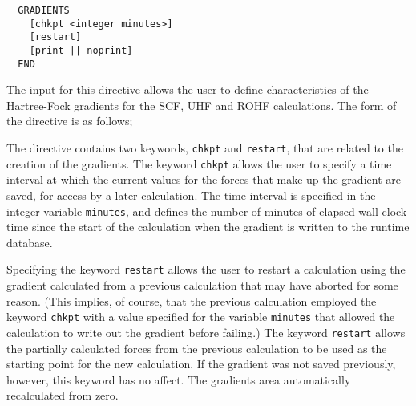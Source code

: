 \label{sec:scfgrad}

\begin{verbatim}
  GRADIENTS 
    [chkpt <integer minutes>]
    [restart]
    [print || noprint]
  END
\end{verbatim}


The input for this directive allows the user to define 
characteristics of the Hartree-Fock gradients for the SCF, UHF and ROHF
calculations.  The form of the directive is as follows;



The directive contains two keywords, \verb+chkpt+ and \verb+restart+,
that are related to the creation of the gradients.  The keyword \verb+chkpt+
allows the user to specify a time interval at which the current values
for the forces that make up 
the gradient are saved, for access by a later calculation.  The time
interval is specified in the integer variable \verb+minutes+, and defines
the number of minutes of elapsed wall-clock time since the start of the
calculation when the gradient is written to the runtime database.




Specifying the keyword \verb+restart+ allows the user to restart a calculation
using the gradient calculated from a previous calculation that may have
aborted for some reason.  (This implies, of course, that the previous
calculation employed the keyword \verb+chkpt+ with a value specified for
the variable \verb+minutes+ that allowed the calculation to write out the
gradient before failing.)  The keyword \verb+restart+ allows the partially
calculated forces from the previous calculation to be used as the starting
point for the new calculation.  If the gradient was not saved previously,
however, this keyword has no affect.  The gradients area automatically 
recalculated from zero.

